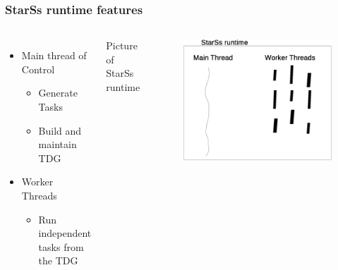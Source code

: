 \documentclass{beamer}
\begin{document}
 \begin{frame}
 
\frametitle{StarSs runtime features}

\begin{columns}
 
 
 \begin{itemize}

 \item Main thread of Control
  \begin{itemize}
   \item Generate Tasks
   \item Build and maintain TDG
  \end{itemize}

  \item Worker Threads
  \begin{itemize}
   \item Run independent tasks from the TDG
  \end{itemize}

 \end{itemize}
  
 Picture of StarSs runtime
  \begin{figure}
  \centering
   \includegraphics[scale=0.10]{StarSs-runtime.eps}
  \end{figure}

 \end{columns}
 \end{frame}
\end{document}
